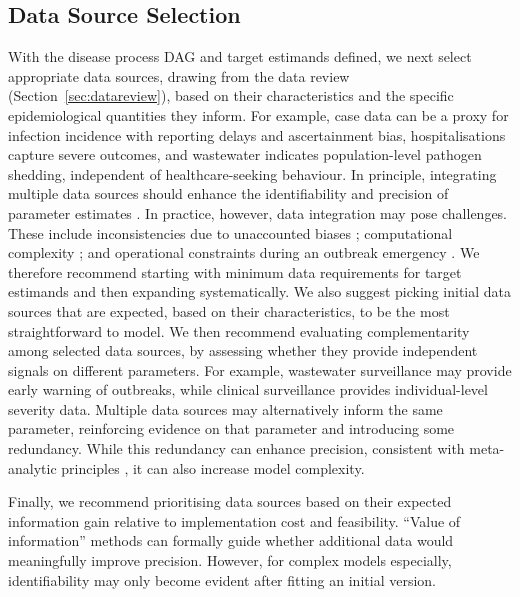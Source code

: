 \documentclass{article}
\begin{document}
\subsection{Data Source Selection} \label{sec:data-selection}

With the disease process \ac{DAG} and target estimands defined, we next select appropriate data sources, drawing from the data review (Section~\ref{sec:datareview}), based on their characteristics and the specific epidemiological quantities they inform.
For example, case data can be a proxy for infection incidence with reporting delays and ascertainment bias, hospitalisations capture severe outcomes, and wastewater indicates population-level pathogen shedding, independent of healthcare-seeking behaviour.
In principle, integrating multiple data sources should enhance the identifiability and precision of parameter estimates \citep{deangelis2018analysing, lison2024generative, russell2024combined, birrell2025real}. In practice, however, data integration may pose challenges. 
These include inconsistencies due to unaccounted biases \citep{presanis2013conflict,knock2021key, Ward2024-sp, corbella2022inferring}; computational complexity \citep{corbella2022inferring}; and operational constraints during an outbreak emergency \citep{mccaw2023role}.
We therefore recommend starting with minimum data requirements for target estimands and then expanding systematically. 
We also suggest picking initial data sources that are expected, based on their characteristics, to be the most straightforward to model.
We then recommend evaluating complementarity among selected data sources, by assessing whether they provide independent signals on different parameters. For example, wastewater surveillance may provide early warning of outbreaks, while clinical surveillance provides individual-level severity data. Multiple data sources may alternatively inform the same parameter, reinforcing evidence on that parameter and introducing some redundancy. While this redundancy can enhance precision, consistent with meta-analytic principles \citep{deangelis2018analysing,borenstein2021introduction}, it can also increase model complexity.

Finally, we recommend prioritising data sources based on their expected information gain relative to implementation cost and feasibility. ``Value of information'' methods \citep{jackson2019value,heath2024value} can formally guide whether additional data would meaningfully improve precision. However, for complex models especially, identifiability may only become evident after fitting an initial version.
\end{document}
